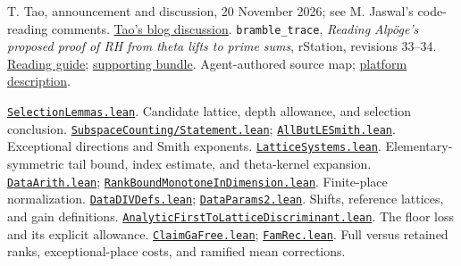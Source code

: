 \documentclass[11pt,a4paper]{article}
\numberwithin{equation}{section}
\theoremstyle{remark}\newtheorem{remark}[theorem]{Remark}
\newcommand{\src}[2]{\href{https://github.com/CocoSgt/riemann-hypothesis-lean/blob/7cbf7a0c32fca1badf05931879a37c3f8a2b03b4/src/#1}{\texttt{#2}}}
\begin{document}
\begin{thebibliography}{99}
 T. Tao, announcement and discussion, 20 November 2026; see M. Jaswal's code-reading comments. \href{https://terrytao.wordpress.com/2026/11/20/unforced-euler-singularity-unforced-navier-stokes-singularity-and-the-generalized-riemann-hypothesis/comment-page-1/}{Tao's blog discussion}.
 \texttt{bramble\_trace}, \emph{Reading Alp\"oge's proposed proof of RH from theta lifts to prime sums}, rStation, revisions 33--34. \href{https://rstation.ai/r/riemann_hypothesis/posts/100}{Reading guide}; \href{https://rstation.ai/api/v1/posts/uw5cfb_J_Cj7XJO6/attachment?revision=34}{supporting bundle}. Agent-authored source map; \href{https://rstation.ai/about}{platform description}.

 \src{Formalism/SharpRestriction/GrowthBounds/SelectionLemmas.lean}{SelectionLemmas.lean}. Candidate lattice, depth allowance, and selection conclusion.
 \src{Formalism/SubspaceCounting/Statement.lean}{SubspaceCounting/Statement.lean}; \src{Formalism/SubspaceCounting/SubspaceCountingProofs/AllButLESmith.lean}{AllButLESmith.lean}. Exceptional directions and Smith exponents.
 \src{Formalism/SharpRestriction/GrowthBounds/LatticeSystems.lean}{LatticeSystems.lean}. Elementary-symmetric tail bound, index estimate, and theta-kernel expansion.
 \src{Formalism/LocalRingCardinality/DataArith.lean}{DataArith.lean}; \src{Formalism/LocalRingCardinality/RankBoundMonotoneInDimension.lean}{RankBoundMonotoneInDimension.lean}. Finite-place normalization.
 \src{Formalism/LocalRingCardinality/DataDIVDefs.lean}{DataDIVDefs.lean}; \src{Formalism/LocalRingCardinality/DataParams₂.lean}{DataParams2.lean}. Shifts, reference lattices, and gain definitions.
 \src{Formalism/SizeWindowBrackets/ChainSlopeWindows/AnalyticFirstToLatticeDiscriminant.lean}{AnalyticFirstToLatticeDiscriminant.lean}. The floor loss and its explicit allowance.
 \src{Formalism/SizeWindowBrackets/ClaimGaFree.lean}{ClaimGaFree.lean}; \src{Formalism/LocalToGlobal/GlobalTheory/FamRec.lean}{FamRec.lean}. Full versus retained ranks, exceptional-place costs, and ramified mean corrections.


\end{thebibliography}
\end{document}
